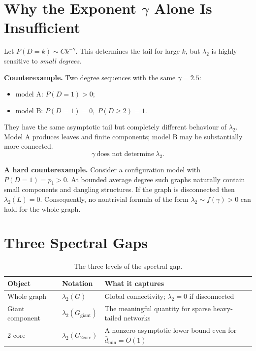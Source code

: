 \documentclass[11pt,a4paper]{article}
\theoremstyle{plain}
\theoremstyle{definition}
\theoremstyle{remark}
\newcommand{\core}{\mathrm{core}}
\newcommand{\giant}{\mathrm{giant}}
\newcommand{\dbar}{\bar d}
\newcommand{\lamtwo}{\lambda_2}
\newcommand{\Ggiant}{G_{\giant}}
\newcommand{\Gtwo}{G_{2\core}}
\begin{document}
\section{Why the Exponent $\gamma$ Alone Is Insufficient}
\label{sec:gamma}

Let $P(D=k)\sim Ck^{-\gamma}$. This determines the tail for large $k$, but
$\lamtwo$ is highly sensitive to \emph{small degrees}.

\textbf{Counterexample.} Two degree sequences with the same $\gamma=2.5$:
\begin{itemize}[leftmargin=*]
\item model A: $P(D=1)>0$;
\item model B: $P(D=1)=0,\;P(D\ge 2)=1$.
\end{itemize}
They have the same asymptotic tail but completely different behaviour of
$\lamtwo$. Model A produces leaves and finite components; model B may be
substantially more connected.
\begin{equation}
\boxed{\;\gamma\ \text{does not determine}\ \lamtwo.\;}
\end{equation}

\textbf{A hard counterexample.} Consider a configuration model with
$P(D=1)=p_1>0$. At bounded average degree such graphs naturally contain small
components and dangling structures. If the graph is disconnected then
$\lamtwo(L)=0$. Consequently, no nontrivial formula of the form
$\lamtwo\sim f(\gamma)>0$ can hold for the whole graph.

\section{Three Spectral Gaps}
\label{sec:three}

\begin{table}[h]
\centering
\begin{tabular}{llp{7.2cm}}
\toprule
Object & Notation & What it captures \\
\midrule
Whole graph & $\lamtwo(G)$ & Global connectivity; $\lamtwo=0$ if disconnected \\
Giant component & $\lamtwo(\Ggiant)$ & The meaningful quantity for sparse heavy-tailed networks \\
2-core & $\lamtwo(\Gtwo)$ & A nonzero asymptotic lower bound even for $\dbar_{\min}=O(1)$ \\
\bottomrule
\end{tabular}
\caption{The three levels of the spectral gap.}
\end{table}
\end{document}
